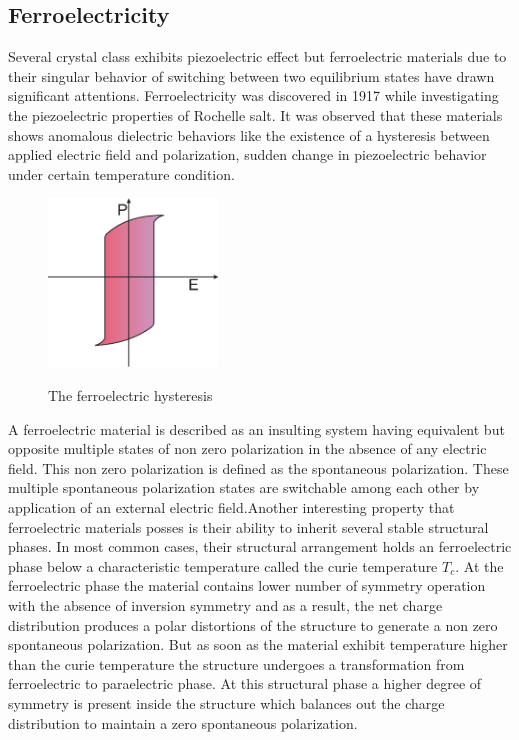 \subsection{Ferroelectricity}
Several crystal class exhibits piezoelectric effect but ferroelectric materials due to their singular behavior of switching between two equilibrium states have drawn significant attentions. Ferroelectricity was discovered in 1917 while investigating the piezoelectric properties of Rochelle salt. It was observed that these materials shows anomalous dielectric behaviors like the existence of a hysteresis between applied electric field and polarization, sudden change in piezoelectric behavior under certain temperature condition.

\begin{figure}[t]
\centering
	\includegraphics[width=0.4\textwidth]{Hysteresis.eps}\\
	\caption[The ferroelectric hysteresis]{The ferroelectric hysteresis}\label{fig:The ferroelectric hysteresis}
\end{figure}

A ferroelectric material is described as an insulting system having equivalent but opposite multiple states of non zero polarization in the absence of any electric field. This non zero polarization is defined as the spontaneous polarization. These multiple spontaneous polarization states are switchable among each other by application of an external electric field.Another interesting property that ferroelectric materials posses is their ability to inherit several stable structural phases. In most common cases, their structural arrangement holds an ferroelectric phase below a characteristic temperature called the curie temperature $T_{c}$. At the ferroelectric phase the material contains lower number of symmetry operation with the absence of inversion symmetry and as a result, the net charge distribution produces a polar distortions of the structure to generate a non zero spontaneous polarization. But as soon as the material exhibit temperature higher than the curie temperature the structure undergoes a transformation from ferroelectric to paraelectric phase. At this structural phase a higher degree of symmetry is present inside the structure which balances out the charge distribution to maintain a zero spontaneous polarization.

